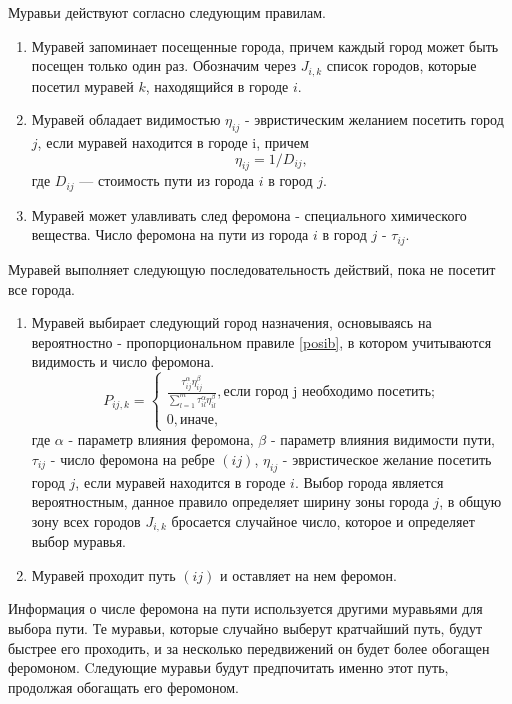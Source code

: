 Муравьи действуют согласно следующим правилам.
\begin{enumerate}
	\item Муравей запоминает посещенные города, причем каждый город может быть посещен только один раз. Обозначим через $J_{i,k}$ список городов, которые посетил муравей $k$, находящийся в городе $i$.
	\item Муравей обладает видимостью $\eta_{ij}$ - эвристическим желанием посетить город $j$, если муравей находится в городе i, причем
	\begin{equation}
		\label{d_func}
		\eta_{ij} = 1 / D_{ij},
	\end{equation}
	где $D_{ij}$ — стоимость пути из города $i$ в город $j$.
	\item Муравей может улавливать след феромона - специального химического вещества. Число феромона на пути из города $i$ в город $j$ - $\tau_{ij}$.
\end{enumerate}

Муравей выполняет следующую последовательность действий, пока не посетит все города.
\begin{enumerate}
	\item Муравей выбирает следующий город назначения, основываясь на вероятностно - пропорциональном правиле \eqref{posib}, в котором учитываются видимость и число феромона.
	\begin{equation}
		\label{posib}
		P_{ij, k} = \begin{cases}
			\frac{\tau_{ij}^\alpha\eta_{ij}^\beta}{\sum_{l=1}^m \tau^\alpha_{il}\eta^\beta_{il}}, \textrm{если город j необходимо посетить;} \\
			0, \textrm{иначе,}
		\end{cases}
	\end{equation}
	где $\alpha$ - параметр влияния феромона, $\beta$ - параметр влияния видимости пути, $\tau_{ij}$ - число феромона на ребре $(ij)$, $\eta_{ij}$ - эвристическое желание посетить город $j$, если муравей находится в городе $i$.
	Выбор города является вероятностным, данное правило определяет ширину зоны города $j$, в общую зону всех городов $J_{i,k}$ бросается случайное число, которое и определяет выбор муравья.
	\item Муравей проходит путь $(ij)$ и оставляет на нем феромон.
\end{enumerate}

Информация о числе феромона на пути используется другими муравьями для выбора пути. Те муравьи, которые случайно выберут кратчайший путь, будут быстрее его проходить, и за несколько передвижений он будет более обогащен феромоном.
Cледующие муравьи будут предпочитать именно этот путь, продолжая обогащать его феромоном. 

